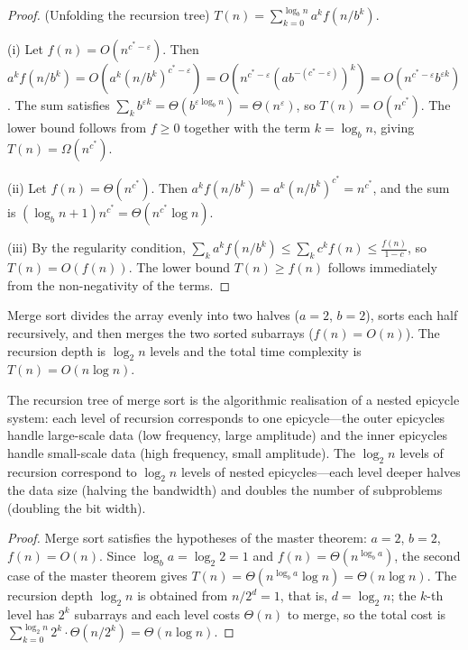 \begin{proof}
(Unfolding the recursion tree) $T(n) = \sum_{k=0}^{\log_b n} a^k f(n/b^k)$.

(i) Let $f(n) = O(n^{c^*-\varepsilon})$. Then $a^k f(n/b^k) = O(a^k (n/b^k)^{c^*-\varepsilon}) = O(n^{c^*-\varepsilon} (a b^{-(c^*-\varepsilon)})^k) = O(n^{c^*-\varepsilon} b^{\varepsilon k})$. The sum satisfies $\sum_k b^{\varepsilon k} = \Theta(b^{\varepsilon \log_b n}) = \Theta(n^\varepsilon)$, so $T(n) = O(n^{c^*})$. The lower bound follows from $f \ge 0$ together with the term $k = \log_b n$, giving $T(n) = \Omega(n^{c^*})$.

(ii) Let $f(n) = \Theta(n^{c^*})$. Then $a^k f(n/b^k) = a^k (n/b^k)^{c^*} = n^{c^*}$, and the sum is $(\log_b n + 1) n^{c^*} = \Theta(n^{c^*} \log n)$.

(iii) By the regularity condition, $\sum_k a^k f(n/b^k) \le \sum_k c^k f(n) \le \frac{f(n)}{1-c}$, so $T(n) = O(f(n))$. The lower bound $T(n)\ge f(n)$ follows immediately from the non-negativity of the terms.
\end{proof}

\begin{proposition}\label{prop:mergesort_cycle}
Merge sort divides the array evenly into two halves ($a=2$, $b=2$), sorts each half recursively, and then merges the two sorted subarrays ($f(n) = O(n)$). The recursion depth is $\log_2 n$ levels and the total time complexity is $T(n) = O(n \log n)$.

The recursion tree of merge sort is the algorithmic realisation of a nested epicycle system: each level of recursion corresponds to one epicycle---the outer epicycles handle large-scale data (low frequency, large amplitude) and the inner epicycles handle small-scale data (high frequency, small amplitude). The $\log_2 n$ levels of recursion correspond to $\log_2 n$ levels of nested epicycles---each level deeper halves the data size (halving the bandwidth) and doubles the number of subproblems (doubling the bit width).
\end{proposition}

\begin{proof}
Merge sort satisfies the hypotheses of the master theorem: $a = 2$, $b = 2$, $f(n) = O(n)$. Since $\log_b a = \log_2 2 = 1$ and $f(n) = \Theta(n^{\log_b a})$, the second case of the master theorem gives $T(n) = \Theta(n^{\log_b a}\log n) = \Theta(n\log n)$. The recursion depth $\log_2 n$ is obtained from $n/2^d = 1$, that is, $d = \log_2 n$; the $k$-th level has $2^k$ subarrays and each level costs $\Theta(n)$ to merge, so the total cost is $\sum_{k=0}^{\log_2 n} 2^k \cdot \Theta(n/2^k) = \Theta(n\log n)$.
\end{proof}

